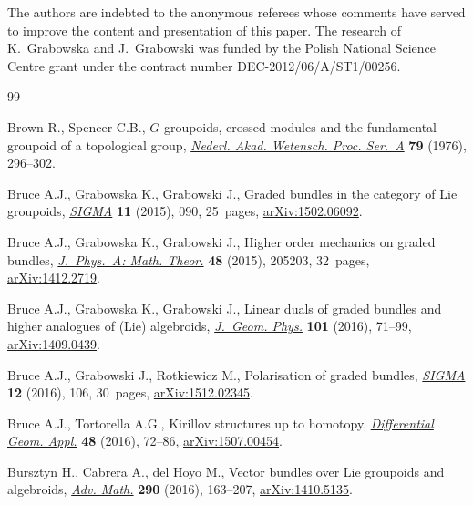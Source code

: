 \documentclass[pdftex]{sigma}
\numberwithin{equation}{section}
\begin{document}
The authors are indebted to the anonymous referees whose comments have served to improve the content and presentation of this paper. The research of K.~Grabowska and J.~Grabowski was funded by the Polish National Science Centre grant under the contract number DEC-2012/06/A/ST1/00256.

\begin{thebibliography}{99}
\footnotesize\itemsep=0pt

Brown R., Spencer C.B., {$G$}-groupoids, crossed modules and the fundamental
 groupoid of a topological group, \href{https://doi.org/10.1016/1385-7258(76)90068-8}{\textit{Nederl. Akad. Wetensch. Proc.
 Ser.~A}} \textbf{79} (1976), 296--302.

Bruce A.J., Grabowska K., Grabowski J., Graded bundles in the category of {L}ie
 groupoids, \href{https://doi.org/10.3842/SIGMA.2015.090}{\textit{SIGMA}} \textbf{11} (2015), 090, 25~pages,
 \href{https://arxiv.org/abs/1502.06092}{arXiv:1502.06092}.

Bruce A.J., Grabowska K., Grabowski J., Higher order mechanics on graded
 bundles, \href{https://doi.org/10.1088/1751-8113/48/20/205203}{\textit{J.~Phys.~A: Math. Theor.}} \textbf{48} (2015), 205203,
 32~pages, \href{https://arxiv.org/abs/1412.2719}{arXiv:1412.2719}.

Bruce A.J., Grabowska K., Grabowski J., Linear duals of graded bundles and
 higher analogues of ({L}ie) algebroids, \href{https://doi.org/10.1016/j.geomphys.2015.12.004}{\textit{J.~Geom. Phys.}} \textbf{101}
 (2016), 71--99, \href{https://arxiv.org/abs/1409.0439}{arXiv:1409.0439}.

Bruce A.J., Grabowski J., Rotkiewicz M., Polarisation of graded bundles,
 \href{https://doi.org/10.3842/SIGMA.2016.106}{\textit{SIGMA}} \textbf{12} (2016), 106, 30~pages, \href{https://arxiv.org/abs/1512.02345}{arXiv:1512.02345}.

Bruce A.J., Tortorella A.G., Kirillov structures up to homotopy,
 \href{https://doi.org/10.1016/j.difgeo.2016.06.005}{\textit{Differential Geom. Appl.}} \textbf{48} (2016), 72--86,
 \href{https://arxiv.org/abs/1507.00454}{arXiv:1507.00454}.

Bursztyn H., Cabrera A., del Hoyo M., Vector bundles over {L}ie groupoids and
 algebroids, \href{https://doi.org/10.1016/j.aim.2015.11.044}{\textit{Adv. Math.}} \textbf{290} (2016), 163--207,
 \href{https://arxiv.org/abs/1410.5135}{arXiv:1410.5135}.


\end{thebibliography}
\end{document}
